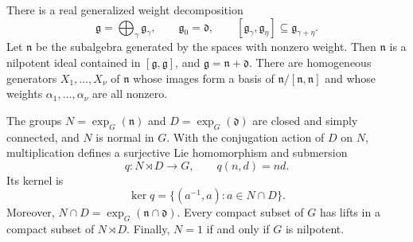 \begin{lemma}\label{lem:cartan-model}
There is a real generalized weight decomposition
\begin{equation}\label{eq:cartan-weight-decomposition}
 \mathfrak g=\bigoplus_\gamma\mathfrak g_\gamma,
 \qquad \mathfrak g_0=\mathfrak d,
 \qquad
 [\mathfrak g_\gamma,\mathfrak g_\eta]
       \subseteq\mathfrak g_{\gamma+\eta}.
\end{equation}
Let $\mathfrak n$ be the subalgebra generated by the spaces with nonzero
weight.  Then $\mathfrak n$ is a nilpotent ideal contained in
$[\mathfrak g,\mathfrak g]$, and $\mathfrak g=\mathfrak n+\mathfrak d$.
There are homogeneous generators $X_1,\ldots,X_\nu$ of $\mathfrak n$ whose
images form a basis of $\mathfrak n/[\mathfrak n,\mathfrak n]$ and whose
weights $\alpha_1,\ldots,\alpha_\nu$ are all nonzero.

The groups $N=\exp_G(\mathfrak n)$ and $D=\exp_G(\mathfrak d)$ are closed
and simply connected, and $N$ is normal in $G$.  With the conjugation
action of $D$ on $N$, multiplication defines a surjective Lie homomorphism
and submersion
\begin{equation}\label{eq:cartan-multiplication}
 q:N\rtimes D\longrightarrow G,\qquad q(n,d)=nd.
\end{equation}
Its kernel is
\begin{equation}\label{eq:cartan-overlap-kernel}
 \ker q=\{(a^{-1},a):a\in N\cap D\}.
\end{equation}
Moreover, $N\cap D=\exp_G(\mathfrak n\cap\mathfrak d)$.
Every compact subset of $G$ has lifts in a compact subset of $N\rtimes D$.
Finally, $N=1$ if and only if $G$ is nilpotent.
\end{lemma}

